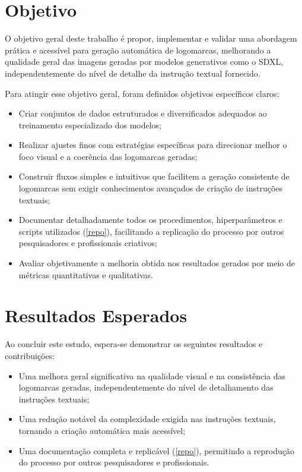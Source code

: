 \documentclass[12pt, %
openright, 
oneside, %
a4paper,    %
brazil]{facom-ufu-abntex2}
\begin{document}
\section{Objetivo}

O objetivo geral deste trabalho é propor, implementar e validar uma abordagem prática e acessível para geração automática de logomarcas, melhorando a qualidade geral das imagens geradas por modelos generativos como o SDXL, independentemente do nível de detalhe da instrução textual fornecido.

Para atingir esse objetivo geral, foram definidos objetivos específicos claros:

\begin{itemize}
    \item Criar conjuntos de dados estruturados e diversificados adequados ao treinamento especializado dos modelos;
    \item Realizar ajustes finos com estratégias específicas para direcionar melhor o foco visual e a coerência das logomarcas geradas;
    \item Construir fluxos simples e intuitivos que facilitem a geração consistente de logomarcas sem exigir conhecimentos avançados de criação de instruções textuais;
    \item Documentar detalhadamente todos os procedimentos, hiperparâmetros e scripts utilizados (\ref{repo}), facilitando a replicação do processo por outros pesquisadores e profissionais criativos;
    \item Avaliar objetivamente a melhoria obtida nos resultados gerados por meio de métricas quantitativas e qualitativas.
\end{itemize}

\section{Resultados Esperados}

Ao concluir este estudo, espera-se demonstrar os seguintes resultados e contribuições:

\begin{itemize}
    \item Uma melhora geral significativa na qualidade visual e na consistência das logomarcas geradas, independentemente do nível de detalhamento das instruções textuais;
    \item Uma redução notável da complexidade exigida nas instruções textuais, tornando a criação automática mais acessível;
    \item Uma documentação completa e replicável (\ref{repo}), permitindo a reprodução do processo por outros pesquisadores e profissionais.
\end{itemize}
\end{document}
